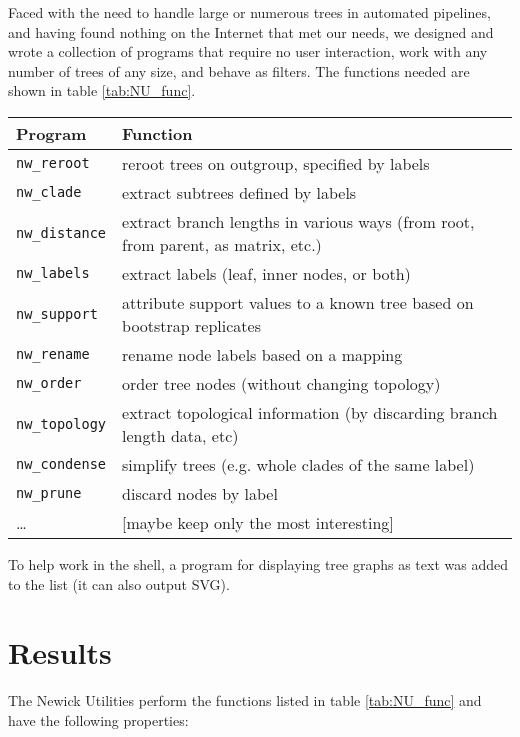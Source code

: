 \documentclass[a4paper,11pt]{article}
\newcommand{\prog}[1]{\texttt{nw\_#1}}
\begin{document}
Faced with the need to handle large or numerous trees in automated pipelines, and having found nothing on the Internet that met our needs, we designed and wrote
a collection of programs that require no user interaction, work with any number of trees of any size, and behave as filters. The functions needed are shown in table \ref{tab:NU_func}.

\begin{table*}
\begin{tabular}{lp{}}
Program & Function \\ 
\hline 
\prog{reroot} & reroot trees on outgroup, specified by labels \\
\prog{clade} & extract subtrees defined by labels \\
\prog{distance} & extract branch lengths in various ways (from root, from parent, as matrix, etc.) \\
\prog{labels} & extract labels (leaf, inner nodes, or both) \\
\prog{support} & attribute support values to a known tree based on bootstrap replicates \\
\prog{rename} & rename node labels based on a mapping \\
\prog{order} & order tree nodes (without changing topology) \\
\prog{topology} & extract topological information (by discarding branch length data, etc) \\
\prog{condense} & simplify trees (e.g. whole clades of the same label) \\
\prog{prune} & discard nodes by label \\
 \ldots & [maybe keep only the most interesting] \\
\hline
\end{tabular}
\caption{The Newick Utilities and their functions}
\label{tab:NU_func}
\end{table*}

To help work in the shell, a program for displaying tree graphs as text was added to the list (it can also output SVG).

\section*{Results}

The Newick Utilities perform the functions listed in table \ref{tab:NU_func} and have the following properties:
\end{document}
